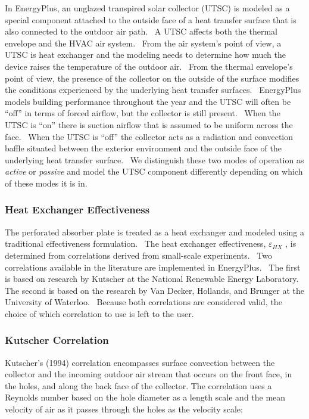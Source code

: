 In EnergyPlus, an unglazed transpired solar collector (UTSC) is modeled as a special component attached to the outside face of a heat transfer surface that is also connected to the outdoor air path.~ A UTSC affects both the thermal envelope and the HVAC air system.~ From the air system's point of view, a UTSC is heat exchanger and the modeling needs to determine how much the device raises the temperature of the outdoor air.~ From the thermal envelope's point of view, the presence of the collector on the outside of the surface modifies the conditions experienced by the underlying heat transfer surfaces.~ EnergyPlus models building performance throughout the year and the UTSC will often be ``off'' in terms of forced airflow, but the collector is still present.~ When the UTSC is ``on'' there is suction airflow that is assumed to be uniform across the face.~ When the UTSC is ``off'' the collector acts as a radiation and convection baffle situated between the exterior environment and the outside face of the underlying heat transfer surface.~ We distinguish these two modes of operation as \emph{active} or \emph{passive} and model the UTSC component differently depending on which of these modes it is in.

\subsubsection{Heat Exchanger Effectiveness}\label{heat-exchanger-effectiveness}

The perforated absorber plate is treated as a heat exchanger and modeled using a traditional effectiveness formulation.~ The heat exchanger effectiveness, \({\varepsilon_{HX}}\) , is determined from correlations derived from small-scale experiments.~ Two correlations available in the literature are implemented in EnergyPlus.~ The first is based on research by Kutscher at the National Renewable Energy Laboratory. The second is based on the research by Van Decker, Hollands, and Brunger at the University of Waterloo.~ Because both correlations are considered valid, the choice of which correlation to use is left to the user.

\subsubsection{Kutscher Correlation}\label{kutscher-correlation}

Kutscher's (1994) correlation encompasses surface convection between the collector and the incoming outdoor air stream that occurs on the front face, in the holes, and along the back face of the collector. The correlation uses a Reynolds number based on the hole diameter as a length scale and the mean velocity of air as it passes through the holes as the velocity scale:

